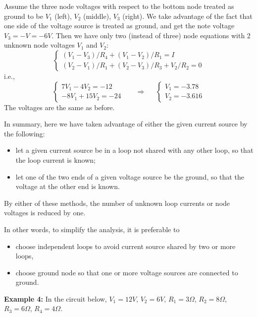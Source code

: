 \documentclass{article}
\begin{document}
\begin{itemize}
  Assume the three node voltages with respect to the bottom node treated
  as ground to be $V_1$ (left), $V_2$ (middle), $V_3$ (right). We take 
  advantage of the fact that one side of the voltage source is treated 
  as ground, and get the note voltage $V_3=-V=-6V$. Then we have only two 
  (instead of three) node equations with 2 unknown node voltages $V_1$ and 
  $V_2$: 
  \begin{equation} 
    \left\{ \begin{array}{l}
      (V_1-V_3)/R_4+(V_1-V_2)/R_1=I \\
      (V_2-V_1)/R_1+(V_2-V_3)/R_3+V_2/R_2=0 \end{array} \right. 
  \end{equation}
  i.e.,
  \begin{equation}
    \left\{ \begin{array}{l}
      7V_1-4V_2=-12 \\
      -8V_1+15V_2=-24 \end{array} \right. 
    \;\;\;\;\;\;\Longrightarrow \;\;\;\;\;
    \left\{ \begin{array}{l}
      V_1=-3.78 \\ V_2=-3.616 \end{array} \right. 
  \end{equation}
  The voltages are the same as before.
\end{itemize}
In summary, here we have taken advantage of either the given current 
source by the following:
\begin{itemize}
\item let a given current source be in a loop not shared with any 
  other loop, so that the loop current is known;
\item let one of the two ends of a given voltage source be the 
  ground, so that the voltage at the other end is known.
\end{itemize}
By either of these methods, the number of unknown loop currents or 
node voltages is reduced by one.

In other words, to simplify the analysis, it is preferable to
\begin{itemize}
  \item choose independent loops to avoid current source shared by 
    two or more loops,
  \item choose ground node so that one or more voltage sources are
    connected to ground.
\end{itemize}

{\bf Example 4:} In the circuit below, $V_1=12 V$, $V_2=6 V$, $R_1=3 
\Omega$, $R_2=8 \Omega$, $R_3=6 \Omega$, $R_4=4\Omega$.
\end{document}

